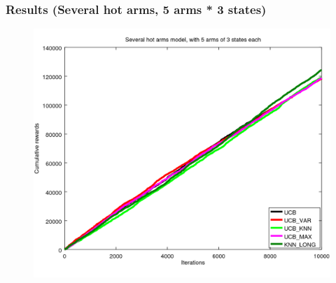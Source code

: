 \documentclass[french]{beamer}
\begin{document}
\begin{frame}
	\frametitle{Results (Several hot arms, 5 arms * 3 states)}
	
	\begin{figure}[h]
		\begin{center}
			\vspace{-10pt}
			\includegraphics[width=1.05\textheight]{all_ms_10000it.png}
			
			\vspace{-10pt}
		\end{center}
	\end{figure}
\end{frame}
\end{document}
